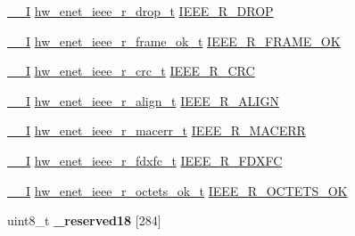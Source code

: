 \begin{DoxyCompactItemize}
\item 
\hyperlink{core__sc300_8h_af63697ed9952cc71e1225efe205f6cd3}{\+\_\+\+\_\+I} \hyperlink{union__hw__enet__ieee__r__drop}{hw\+\_\+enet\+\_\+ieee\+\_\+r\+\_\+drop\+\_\+t} \hyperlink{struct__hw__enet_abcffb3a3e64e110c1e1780c861956c5f}{I\+E\+E\+E\+\_\+\+R\+\_\+\+D\+R\+OP}
\item 
\hyperlink{core__sc300_8h_af63697ed9952cc71e1225efe205f6cd3}{\+\_\+\+\_\+I} \hyperlink{union__hw__enet__ieee__r__frame__ok}{hw\+\_\+enet\+\_\+ieee\+\_\+r\+\_\+frame\+\_\+ok\+\_\+t} \hyperlink{struct__hw__enet_a16be28b6e3aa41eb8230b8a88d833844}{I\+E\+E\+E\+\_\+\+R\+\_\+\+F\+R\+A\+M\+E\+\_\+\+OK}
\item 
\hyperlink{core__sc300_8h_af63697ed9952cc71e1225efe205f6cd3}{\+\_\+\+\_\+I} \hyperlink{union__hw__enet__ieee__r__crc}{hw\+\_\+enet\+\_\+ieee\+\_\+r\+\_\+crc\+\_\+t} \hyperlink{struct__hw__enet_a855e7a3efeb835e5e6ccee406b2e17a0}{I\+E\+E\+E\+\_\+\+R\+\_\+\+C\+RC}
\item 
\hyperlink{core__sc300_8h_af63697ed9952cc71e1225efe205f6cd3}{\+\_\+\+\_\+I} \hyperlink{union__hw__enet__ieee__r__align}{hw\+\_\+enet\+\_\+ieee\+\_\+r\+\_\+align\+\_\+t} \hyperlink{struct__hw__enet_ad6b480f2330bf1c87d6c57a5a01758f7}{I\+E\+E\+E\+\_\+\+R\+\_\+\+A\+L\+I\+GN}
\item 
\hyperlink{core__sc300_8h_af63697ed9952cc71e1225efe205f6cd3}{\+\_\+\+\_\+I} \hyperlink{union__hw__enet__ieee__r__macerr}{hw\+\_\+enet\+\_\+ieee\+\_\+r\+\_\+macerr\+\_\+t} \hyperlink{struct__hw__enet_ad2089f90414f19d727288c7b30eced66}{I\+E\+E\+E\+\_\+\+R\+\_\+\+M\+A\+C\+E\+RR}
\item 
\hyperlink{core__sc300_8h_af63697ed9952cc71e1225efe205f6cd3}{\+\_\+\+\_\+I} \hyperlink{union__hw__enet__ieee__r__fdxfc}{hw\+\_\+enet\+\_\+ieee\+\_\+r\+\_\+fdxfc\+\_\+t} \hyperlink{struct__hw__enet_a4b1833b00202054b758c3d67aa21a2fb}{I\+E\+E\+E\+\_\+\+R\+\_\+\+F\+D\+X\+FC}
\item 
\hyperlink{core__sc300_8h_af63697ed9952cc71e1225efe205f6cd3}{\+\_\+\+\_\+I} \hyperlink{union__hw__enet__ieee__r__octets__ok}{hw\+\_\+enet\+\_\+ieee\+\_\+r\+\_\+octets\+\_\+ok\+\_\+t} \hyperlink{struct__hw__enet_a660d3468a272beba5daf3eea509da8eb}{I\+E\+E\+E\+\_\+\+R\+\_\+\+O\+C\+T\+E\+T\+S\+\_\+\+OK}
\item 
uint8\+\_\+t {\bfseries \+\_\+reserved18} \mbox{[}284\mbox{]}\hypertarget{struct__hw__enet_a57aeff9a83bf3be61d8b987a36078d50}{}\label{struct__hw__enet_a57aeff9a83bf3be61d8b987a36078d50}


\end{DoxyCompactItemize}
